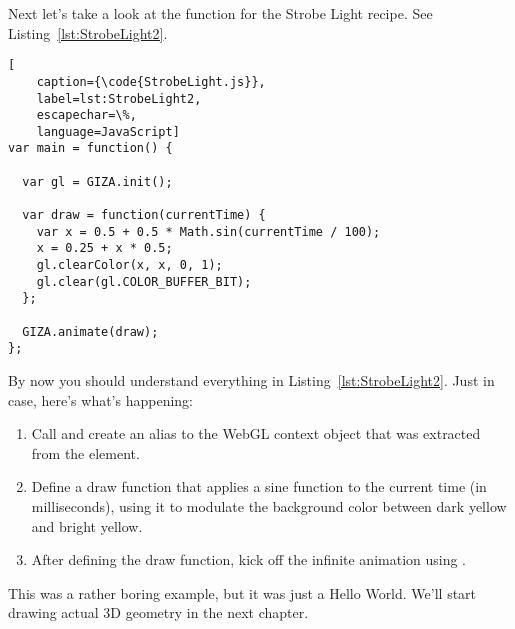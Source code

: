 \begin{comment}
{RecipeName}.js
{RecipeName}.html
common.js
css/style.css
lib/require.js
lib/giza.min.js
\end{comment}

Next let's take a look at the  function for the Strobe Light recipe.  See Listing~\ref{lst:StrobeLight2}.

\begin{lstlisting}[
    caption={\code{StrobeLight.js}},
    label=lst:StrobeLight2,
    escapechar=\%,
    language=JavaScript]
var main = function() {

  var gl = GIZA.init();

  var draw = function(currentTime) {
    var x = 0.5 + 0.5 * Math.sin(currentTime / 100);
    x = 0.25 + x * 0.5;
    gl.clearColor(x, x, 0, 1);
    gl.clear(gl.COLOR_BUFFER_BIT);
  };

  GIZA.animate(draw);
};
\end{lstlisting} 

By now you should understand everything in Listing~\ref{lst:StrobeLight2}.  Just in case, here's what's happening:

\begin{enumerate}
\item Call  and create an alias to the WebGL context object that was extracted from the  element.
\item Define a draw function that applies a sine function to the current time (in milliseconds), using it to modulate the background color between dark yellow and bright yellow.
\item After defining the draw function, kick off the infinite animation using .
\end{enumerate}

This was a rather boring example, but it was just a Hello World.  We'll start drawing actual 3D geometry in the next chapter.
